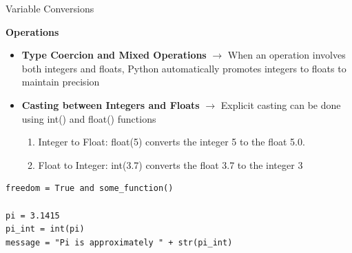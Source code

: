 \documentclass[
	11pt, 
]{beamer}
\begin{document}
\begin{frame}[fragile]{Variable Conversions}
    

\begin{alertblock}{\textbf{Operations}}
    \begin{itemize}
        \item \textbf{Type Coercion and Mixed Operations}  $\rightarrow$ When an operation involves both integers and floats, Python automatically promotes integers to floats to maintain precision
        \item \textbf{Casting between Integers and Floats} $\rightarrow$ Explicit casting can be done using int() and float() functions \smallskip

        \begin{enumerate}
            \item Integer to Float: float(5) converts the integer 5 to the float 5.0.
            \item Float to Integer: int(3.7) converts the float 3.7 to the integer 3
        \end{enumerate}
    \end{itemize}
\end{alertblock}

\begin{verbatim}
freedom = True and some_function()

pi = 3.1415
pi_int = int(pi)
message = "Pi is approximately " + str(pi_int)
\end{verbatim}

\end{frame}
\end{document}
